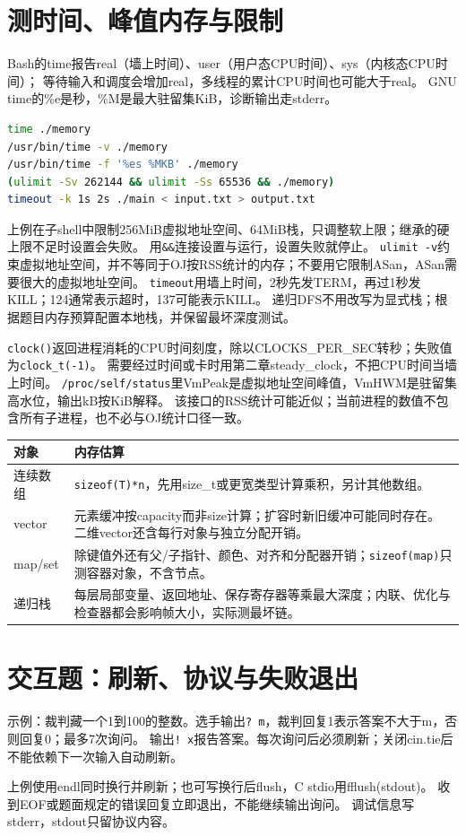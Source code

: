 \section{测时间、峰值内存与限制}
Bash的time报告real（墙上时间）、user（用户态CPU时间）、sys（内核态CPU时间）；
等待输入和调度会增加real，多线程的累计CPU时间也可能大于real。
GNU time的\%e是秒，\%M是最大驻留集KiB，诊断输出走stderr。
\begin{lstlisting}[language=bash]
time ./memory
/usr/bin/time -v ./memory
/usr/bin/time -f '%es %MKB' ./memory
(ulimit -Sv 262144 && ulimit -Ss 65536 && ./memory)
timeout -k 1s 2s ./main < input.txt > output.txt
\end{lstlisting}
上例在子shell中限制256MiB虚拟地址空间、64MiB栈，只调整软上限；继承的硬上限不足时设置会失败。
用\texttt{\&\&}连接设置与运行，设置失败就停止。
\texttt{ulimit -v}约束虚拟地址空间，并不等同于OJ按RSS统计的内存；不要用它限制ASan，ASan需要很大的虚拟地址空间。
\texttt{timeout}用墙上时间，2秒先发TERM，再过1秒发KILL；124通常表示超时，137可能表示KILL。
递归DFS不用改写为显式栈；根据题目内存预算配置本地栈，并保留最坏深度测试。


\texttt{clock()}返回进程消耗的CPU时间刻度，除以CLOCKS\_PER\_SEC转秒；失败值为\texttt{clock\_t(-1)}。
需要经过时间或卡时用第二章steady\_clock，不把CPU时间当墙上时间。
\texttt{/proc/self/status}里VmPeak是虚拟地址空间峰值，VmHWM是驻留集高水位，输出kB按KiB解释。
该接口的RSS统计可能近似；当前进程的数值不包含所有子进程，也不必与OJ统计口径一致。

\begin{longtable}{p{40mm}p{119mm}}\toprule 对象 & 内存估算\\\midrule\endhead
连续数组 & \texttt{sizeof(T)*n}，先用size\_t或更宽类型计算乘积，另计其他数组。\\
vector & 元素缓冲按capacity而非size计算；扩容时新旧缓冲可能同时存在。二维vector还含每行对象与独立分配开销。\\
map/set & 除键值外还有父/子指针、颜色、对齐和分配器开销；\texttt{sizeof(map)}只测容器对象，不含节点。\\
递归栈 & 每层局部变量、返回地址、保存寄存器等乘最大深度；内联、优化与检查器都会影响帧大小，实际测最坏链。\\\bottomrule
\end{longtable}

\newpage
\section{交互题：刷新、协议与失败退出}
示例：裁判藏一个1到100的整数。选手输出\texttt{? m}，裁判回复1表示答案不大于m，否则回复0；最多7次询问。
输出\texttt{! x}报告答案。每次询问后必须刷新；关闭cin.tie后不能依赖下一次输入自动刷新。

上例使用endl同时换行并刷新；也可写换行后flush，C stdio用fflush(stdout)。
收到EOF或题面规定的错误回复立即退出，不能继续输出询问。
调试信息写stderr，stdout只留协议内容。

